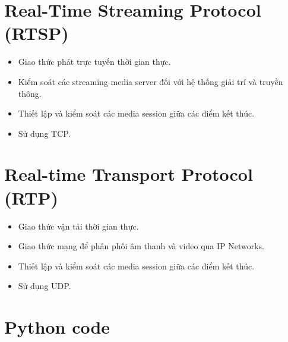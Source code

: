 \documentclass[a4paper]{article}
\begin{document}
\section{Real-Time Streaming Protocol (RTSP)}
\begin{itemize}
\item Giao thức phát trực tuyến thời gian thực.\\
\item Kiểm soát các streaming media server đối với hệ thống giải trí và truyền thông.\\
\item Thiết lập và kiểm soát các media session giữa các điểm kết thúc.\\
\item Sử dụng TCP.\\
\end{itemize}


\section{Real-time Transport Protocol (RTP)}
\begin{itemize}
\item Giao thức vận tải thời gian thực.\\
\item Giao thức mạng để phân phối âm thanh và video qua IP Networks.\\
\item Thiết lập và kiểm soát các media session giữa các điểm kết thúc.\\
\item Sử dụng UDP.\\
\end{itemize}


\section{Python code}
\end{document}
